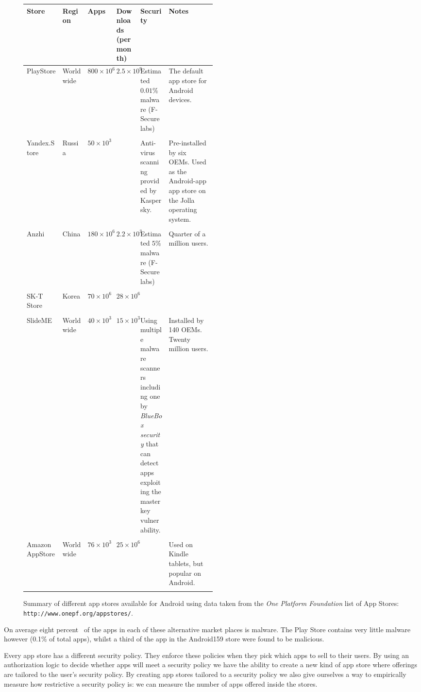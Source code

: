 \documentclass[a4paper,sfsidenotes]{%
  article%
}
\begin{document}
\begin{figure}\centering\footnotesize
  \begin{tabular}{l l l p{0.1\linewidth} p{0.15\linewidth} p{0.25\linewidth}}
    \toprule
    Store & Region & Apps & Downloads (per month) & Security & Notes \\
    \midrule
    PlayStore & Worldwide & $800\times10^6$ & $2.5\times10^9$ & Estimated $0.01\%$ malware (F-Secure labs) & The default app store for Android devices.\\
    \addlinespace \\
    Yandex.Store & Russia & $50\times10^3$ & & Anti-virus scanning provided by Kaspersky. & Pre-installed by six OEMs. Used as the Android-app app store on the Jolla operating system. \\
    \addlinespace \\
    Anzhi & China & $180\times10^6$ & $2.2\times10^3$ & Estimated $5\%$ malware (F-Secure labs) & Quarter of a million users.\\
    \addlinespace \\
    SK-T Store & Korea & $70\times10^6$ & $28\times10^6$ & & \\
    \addlinespace \\
    SlideME & Worldwide & $40\times10^3$ & $15\times10^3$ & Using multiple malware scanners including one by \emph{BlueBox security} that can detect apps exploiting the master key vulnerability. & Installed by 140 OEMs. Twenty million users. \\
    \addlinespace \\
    Amazon AppStore & Worldwide & $76\times10^3$ & $25\times10^6$ & & Used on
    Kindle tablets, but popular on Android. \\
    \bottomrule
    \\
  \end{tabular}
  \caption{Summary of different app stores available for Android using data
    taken from the \emph{One Platform Foundation} list of App Stores:
    \texttt{http://www.onepf.org/appstores/}.}
    \label{tab:stores}
  \end{figure}

On average eight percent~\cite{AQUILINO:2013wr} of the apps in each of these
alternative market places is malware. The Play Store contains very little
malware however (0.1\% of total apps), whilst a third of the app in the
Android159 store were found to be malicious.

Every app store has a different security policy.  They enforce these
policies when they pick which apps to sell to their users.  By using an
authorization logic to decide whether apps will meet a security policy we have
the ability to create a new kind of app store where offerings are tailored to
the user's security policy.  By creating app stores tailored to a security
policy we also give ourselves a way to empirically measure how restrictive a
security policy is: we can measure the number of apps offered inside the stores.
\end{document}
